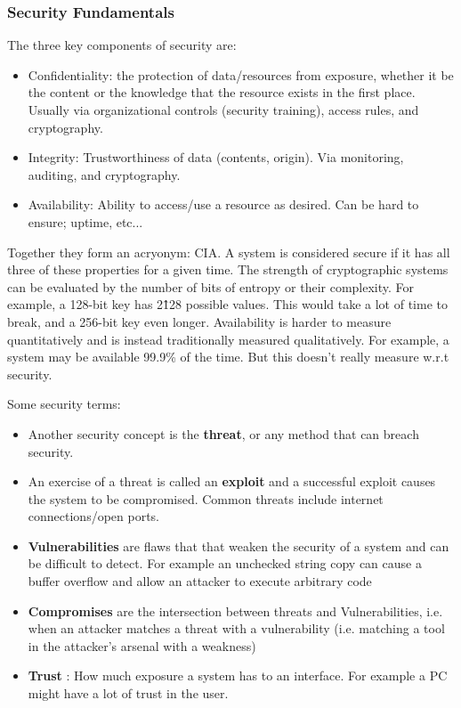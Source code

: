 \documentclass[../notes.tex]{subfiles}
\begin{document}
\subsubsection{Security Fundamentals}

The three key components of security are:

\begin{itemize}
    \item Confidentiality: the protection of data/resources from exposure, whether it be the content or the knowledge that the resource exists in the first place. Usually via organizational controls (security training), access rules, and cryptography.
    \item Integrity: Trustworthiness of data (contents, origin). Via monitoring, auditing, and cryptography.
    \item Availability: Ability to access/use a resource as desired. Can be hard to ensure; uptime, etc...
\end{itemize}

Together they form an acryonym: CIA. A system is considered secure if it has all three of these properties for a given time.
The strength of cryptographic systems can be evaluated by the number of bits of entropy or their complexity. For example, a 128-bit key has 2\^128 possible values. This would take a lot of time to break, and a 256-bit key even longer.
Availability is harder to measure quantitatively and is instead traditionally measured qualitatively. For example, a system may be available 99.9\% of the time. But this doesn't really measure w.r.t security.


Some security terms:
\begin{itemize}
    \item Another security concept is the \textbf{threat}, or any method that can breach security.
    \item An exercise of a threat is called an \textbf{exploit}  and a successful exploit causes the system to be compromised. Common threats include internet connections/open ports.
    \item \textbf{Vulnerabilities}  are flaws that that weaken the security of a system and can be difficult to detect. For example an unchecked string copy can cause a buffer overflow and allow an attacker to execute arbitrary code
    \item \textbf{Compromises} are the intersection between threats and Vulnerabilities, i.e. when an attacker matches a threat with a vulnerability (i.e. matching a tool in the attacker's arsenal with a weakness)
    \item \textbf{Trust} : How much exposure a system has to an interface. For example a PC might have a lot of trust in the user.
\end{itemize}
\end{document}
